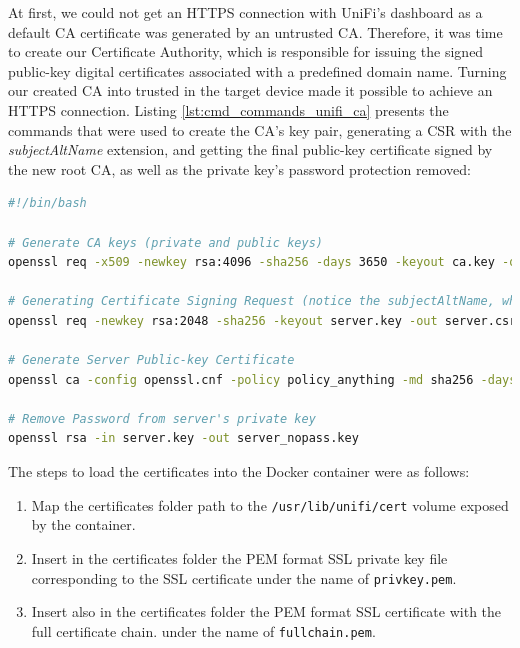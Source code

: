 At first, we could not get an HTTPS connection with UniFi's dashboard as a default CA certificate was generated by an untrusted CA. Therefore, it was time to create our Certificate Authority, which is responsible for issuing the signed public-key digital certificates associated with a predefined domain name. Turning our created CA into trusted in the target device made it possible to achieve an HTTPS connection. Listing \ref{lst:cmd_commands_unifi_ca} presents the commands that were used to create the CA's key pair, generating a CSR with the \textit{subjectAltName} extension, and getting the final public-key certificate signed by the new root CA, as well as the private key's password protection removed:


\begin{lstlisting}[language=bash,caption=Generating an SSL Certificate for UniFi's dashboard.,numbers=none,label={lst:cmd_commands_unifi_ca}]
#!/bin/bash

# Generate CA keys (private and public keys)
openssl req -x509 -newkey rsa:4096 -sha256 -days 3650 -keyout ca.key -out ca.crt

# Generating Certificate Signing Request (notice the subjectAltName, which is mandatory, at least in Firefox!)
openssl req -newkey rsa:2048 -sha256 -keyout server.key -out server.csr -subj "/CN=example-domain.ui.com/O=UniFi/C=US" -passout pass:pass -addext "subjectAltName = DNS:example-domain.ui.com"

# Generate Server Public-key Certificate
openssl ca -config openssl.cnf -policy policy_anything -md sha256 -days 3650 -in server.csr -out server.crt -batch -cert ca.crt -keyfile ca.key

# Remove Password from server's private key
openssl rsa -in server.key -out server_nopass.key
\end{lstlisting}

The steps to load the certificates into the Docker container were as follows:

\begin{enumerate}
    \item Map the certificates folder path to the \texttt{/usr/lib/unifi/cert} volume exposed by the container.
    \item Insert in the certificates folder the PEM format SSL private key file corresponding to the SSL certificate under the name of \texttt{privkey.pem}.
    \item Insert also in the certificates folder the PEM format SSL certificate with the full certificate chain. under the name of \texttt{fullchain.pem}.
\end{enumerate}

